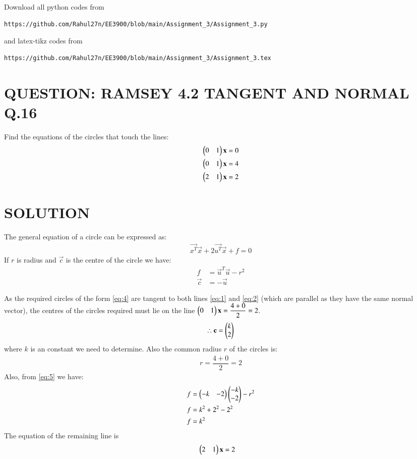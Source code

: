 \documentclass[journal,12pt,twocolumn]{IEEEtran}
\begin{document}
\maketitle
\newpage
\bigskip
\renewcommand{\thefigure}{\theenumi}
\renewcommand{\thetable}{\theenumi}
Download all python codes from 
\begin{lstlisting}
https://github.com/Rahul27n/EE3900/blob/main/Assignment_3/Assignment_3.py
\end{lstlisting}
%
and latex-tikz codes from 
%
\begin{lstlisting}
https://github.com/Rahul27n/EE3900/blob/main/Assignment_3/Assignment_3.tex
\end{lstlisting}
\vspace{0.5cm}
\section{QUESTION: RAMSEY 4.2 TANGENT AND NORMAL Q.16}
Find the equations of the circles that touch the lines:
\begin{align}
\begin{pmatrix}0 & 1\end{pmatrix}\mathbf{x} &= 0 \label{eq:1}
\\\begin{pmatrix}0 & 1\end{pmatrix}\mathbf{x} &= 4 \label{eq:2}
\\\begin{pmatrix}2 & 1\end{pmatrix}\mathbf{x} &= 2 \label{eq:3}
\end{align}
\section{SOLUTION}
The general equation of a circle can be expressed as:
\begin{align}
\vec{x^T}\vec{x} + 2\vec{u^T}\vec{x} + f = 0 \label{eq:4}
\end{align}
If $r$ is radius and $\vec{c}$ is the centre of the circle we have:
\begin{align}
f &=\vec{u}^T\vec{u}-r^2  \label{eq:5} \\  
\vec{c} &=-\vec{u}
\end{align}

 As the required circles of the form \eqref{eq:4} are tangent to both lines \eqref{eq:1} and \eqref{eq:2} (which are parallel as they have the same normal vector), the centres of the circles required must lie on the line $\begin{pmatrix}0 & 1\end{pmatrix}\mathbf{x} = \dfrac{4+0}{2} = 2$.
\begin{align}
\therefore \mathbf{c} = \begin{pmatrix}k \\ 2\end{pmatrix}
\end{align}
where $k$ is an constant we need to determine. Also the common radius $r$ of the circles is:
\begin{align}
r= \dfrac{4+0}{2} = 2   
\end{align}
Also, from \eqref{eq:5} we have:
\begin{align}
f &=\begin{pmatrix}-k&-2\end{pmatrix}\begin{pmatrix}-k\\-2\end{pmatrix}-r^2\\
f &= k^2 + 2^2 -2^2\\
f &= k^2\label{eq:6}
\end{align}
The equation of the remaining line is
\begin{align}
\begin{pmatrix}2 & 1\end{pmatrix}\mathbf{x}& = 2 \label{eq:7}
\end{align}
\end{document}

